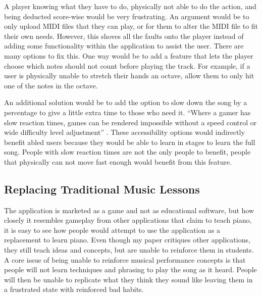 \documentclass[10pt,twocolumn]{article}
\begin{document}
A player knowing what they have to do, physically not able to do the action, and being deducted score-wise would be very frustrating. An argument would be to only upload MIDI files that they can play, or for them to alter the MIDI file to fit their own needs. However, this shoves all the faults onto the player instead of adding some functionality within the application to assist the user. There are many options to fix this. One way would be to add a feature that lets the player choose which notes should not count before playing the track. For example, if a user is physically unable to stretch their hands an octave, allow them to only hit one of the notes in the octave.

An additional solution would be to add the option to slow down the song by a percentage to give a little extra time to those who need it. “Where a gamer has slow reaction times, games can be rendered impossible without a speed control or wide difficulty level adjustment” \cite{Bierre}. These accessibility options would indirectly benefit abled users because they would be able to learn in stages to learn the full song. People with slow reaction times are not the only people to benefit, people that physically can not move fast enough would benefit from this feature. 

\subsection{Replacing Traditional Music Lessons}

The application is marketed as a game and not as educational software, but how closely it resembles gameplay from other applications that claim to teach piano, it is easy to see how people would attempt to use the application as a replacement to learn piano. Even though my paper critiques other applications, they still teach ideas and concepts, but are unable to reinforce them in students. A core issue of being unable to reinforce musical performance concepts is that people will not learn techniques and phrasing to play the song as it heard. People will then be unable to replicate what they think they sound like leaving them in a frustrated state with reinforced bad habits. 
\end{document}
